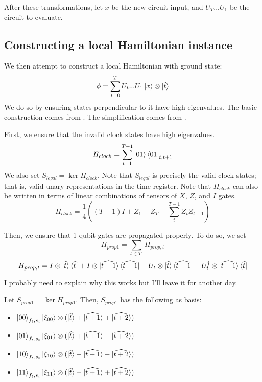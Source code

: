After these transformations, let $x$ be the new circuit input, and $U_T...U_1$ be the circuit to evaluate.

\subsection{Constructing a local Hamiltonian instance}

We then attempt to construct a local Hamiltonian with ground state: $$\phi=\sum_{t=0}^TU_t...U_1\ket{x}\otimes\ket{\hat{t}}$$
We do so by ensuring states perpendicular to it have high eigenvalues. The basic construction comes from \cite{kitaev2002classical}. The simplification comes from \cite{biamonte_love_2008}.

First, we ensure that the invalid clock states have high eigenvalues.
$$H_{clock}=\sum_{t=1}^{T-1}\ket{01}\bra{01}_{t,t+1}$$
We also set $S_{legal}=\ker H_{clock}$. Note that $S_{legal}$ is precisely the valid clock states; that is, valid unary representations in the time register. Note that $H_{clock}$ can also be written in terms of linear combinations of tensors of $X$, $Z$, and $I$ gates.
$$H_{clock}=\frac{1}{4}((T-1)I + Z_1 - Z_T - \sum_t^{T-1}Z_tZ_{t+1})$$

Then, we ensure that 1-qubit gates are propagated properly. To do so, we set
	$$H_{prop1}=\sum_{t\in T_1}H_{prop,t}$$
	$$H_{prop,t}=I\otimes\ket{\widehat{t}}\bra{\widehat{t}}
		+I\otimes\ket{\widehat{t-1}}\bra{\widehat{t-1}}
		-U_t\otimes\ket{\widehat{t}}\bra{\widehat{t-1}}
		-U_t^\dagger\otimes\ket{\widehat{t-1}}\bra{\widehat{t}}$$

I probably need to explain why this works but I'll leave it for another day.

Let $S_{prop1}=\ker H_{prop1}$.
Then, $S_{prop1}$ has the following as basis:
\begin{itemize}
	\item $\ket{00}_{f_t,s_t}\ket{\xi_{00}}\otimes
		(\ket{\widehat{t}}+\ket{\widehat{t+1}}+\ket{\widehat{t+2}})$
	\item $\ket{01}_{f_t,s_t}\ket{\xi_{01}}\otimes
		(\ket{\widehat{t}}+\ket{\widehat{t+1}}-\ket{\widehat{t+2}})$
	\item $\ket{10}_{f_t,s_t}\ket{\xi_{10}}\otimes
		(\ket{\widehat{t}}-\ket{\widehat{t+1}}-\ket{\widehat{t+2}})$
	\item $\ket{11}_{f_t,s_t}\ket{\xi_{11}}\otimes
		(\ket{\widehat{t}}-\ket{\widehat{t+1}}+\ket{\widehat{t+2}})$
\end{itemize}

